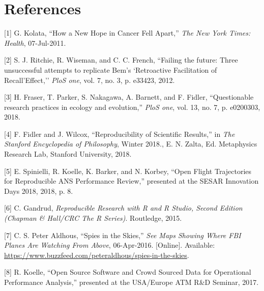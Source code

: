 \documentclass[conference,final,a4paper,]{IEEEtran}
\begin{document}
\hypertarget{references}{%
\section*{References}\label{references}}

\begingroup

\noindent
\vspace{-1em}
\setlength{\parindent}{-5mm}
\setlength{\leftskip}{5mm}
\setlength{\parskip}{0pt}
\footnotesize

\hypertarget{refs}{}
\leavevmode\hypertarget{ref-kolata_2011}{}%
{[}1{]} G. Kolata, ``How a New Hope in Cancer Fell Apart,'' \emph{The New York Times: Health}, 07-Jul-2011.

\leavevmode\hypertarget{ref-ritchie_2012}{}%
{[}2{]} S. J. Ritchie, R. Wiseman, and C. C. French, ``Failing the future: Three unsuccessful attempts to replicate Bem's `Retroactive Facilitation of Recall'Effect,'' \emph{PloS one}, vol. 7, no. 3, p. e33423, 2012.

\leavevmode\hypertarget{ref-fraser_etal_2018}{}%
{[}3{]} H. Fraser, T. Parker, S. Nakagawa, A. Barnett, and F. Fidler, ``Questionable research practices in ecology and evolution,'' \emph{PloS one}, vol. 13, no. 7, p. e0200303, 2018.

\leavevmode\hypertarget{ref-fidler_wilcox_2018}{}%
{[}4{]} F. Fidler and J. Wilcox, ``Reproducibility of Scientific Results,'' in \emph{The Stanford Encyclopedia of Philosophy}, Winter 2018., E. N. Zalta, Ed. Metaphysics Research Lab, Stanford University, 2018.

\leavevmode\hypertarget{ref-spinielli_2018}{}%
{[}5{]} E. Spinielli, R. Koelle, K. Barker, and N. Korbey, ``Open Flight Trajectories for Reproducible ANS Performance Review,'' presented at the SESAR Innovation Days 2018, 2018, p. 8.

\leavevmode\hypertarget{ref-gandrud_2015}{}%
{[}6{]} C. Gandrud, \emph{Reproducible Research with R and R Studio, Second Edition (Chapman \& Hall/CRC The R Series)}. Routledge, 2015.

\leavevmode\hypertarget{ref-peteraldhous_2016}{}%
{[}7{]} C. S. Peter Aldhous, ``Spies in the Skies,'' \emph{See Maps Showing Where FBI Planes Are Watching From Above}, 06-Apr-2016. {[}Online{]}. Available: \url{https://www.buzzfeed.com/peteraldhous/spies-in-the-skies}.

\leavevmode\hypertarget{ref-koelle_open_2017}{}%
{[}8{]} R. Koelle, ``Open Source Software and Crowd Sourced Data for Operational Performance Analysis,'' presented at the USA/Europe ATM R\&D Seminar, 2017.
\end{document}
